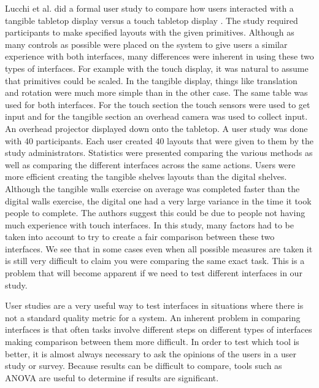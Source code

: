 Lucchi et al. did a formal user study to compare how users interacted with a tangible tabletop display versus a touch tabletop display \cite{1709917}.  The study required participants to make specified layouts with the given primitives.  Although as many controls as possible were placed on the system to give users a similar experience with both interfaces, many differences were inherent in using these two types of interfaces.  For example with the touch display, it was natural to assume that primitives could be scaled.  In the tangible display, things like translation and rotation were much more simple than in the other case.  The same table was used for both interfaces.  For the touch section the touch sensors were used to get input and for the tangible section an overhead camera was used to collect input.  An overhead projector displayed down onto the tabletop.  A user study was done with 40 participants.  Each user created 40 layouts that were given to them by the study administrators. Statistics were presented comparing the various methods as well as comparing the different interfaces across the same actions.  Users were more efficient creating the tangible shelves layouts than the digital shelves.  Although the tangible walls exercise on average was completed faster than the digital walls exercise, the digital one had a very large variance in the time it took people to complete.  The authors suggest this could be due to people not having much experience with touch interfaces.  In this study, many factors had to be taken into account to try to create a fair comparison between these two interfaces.  We see that in some cases even when all possible measures are taken it is still very difficult to claim you were comparing the same exact task.  This is a problem that will become apparent if we need to test different interfaces in our study.

User studies are a very useful way to test interfaces in situations where there is not a standard quality metric for a system.   An inherent problem in comparing interfaces is that often tasks involve different steps on different types of interfaces making comparison between them more difficult. In order to test which tool is better, it is almost always necessary to ask the opinions of the users in a user study or survey.  Because results can be difficult to compare, tools such as ANOVA are useful to determine if results are significant. 

